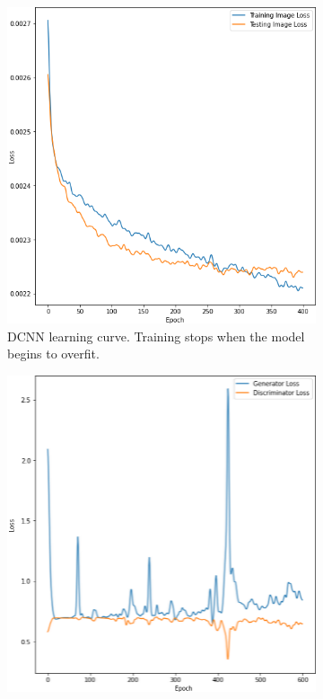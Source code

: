 \documentclass{l4proj}
\begin{document}
\begin{figure}[H]
    \centering
    \begin{subfigure}[b]{0.3\textwidth}
        \includegraphics[width=\textwidth]{images/DCNNTime.png}
        \caption{DCNN learning curve. Training stops when the model begins to overfit.}
        \label{fig:dcnntime}
    \end{subfigure}
    \begin{subfigure}[b]{0.3\textwidth}
        \includegraphics[width=\textwidth]{images/CGANTime.png}

\end{subfigure}
\end{figure}
\end{document}
